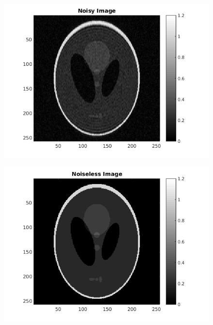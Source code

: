 \documentclass[11pt]{article}
\begin{document}
\subsection{}
\begin{figure}[h]
\centering
\includegraphics[scale=0.5]{Noisy}
\end{figure}

\begin{figure}[h]
\centering
\includegraphics[scale=0.5]{Noiseless}
\end{figure}
\end{document}
